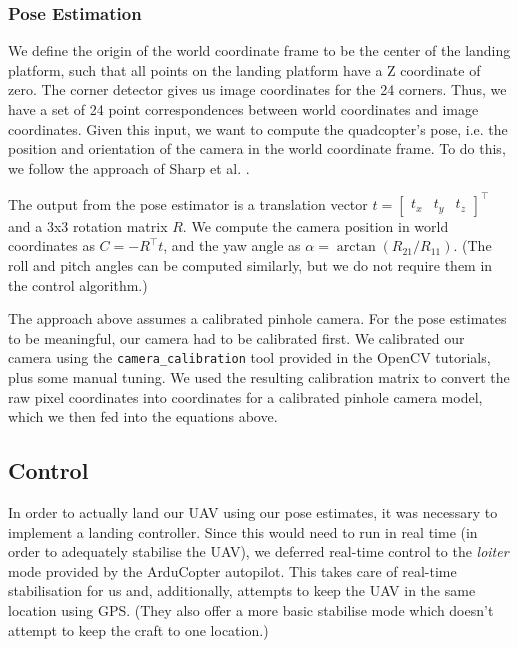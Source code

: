 \documentclass[10pt]{scrartcl} %
\begin{document}
\subsubsection{Pose Estimation}

We define the origin of the world coordinate frame to be the center of the
landing platform, such that all points on the landing platform have a Z
coordinate of zero. The corner detector gives us image coordinates for the 24
corners. Thus, we have a set of 24 point correspondences between world
coordinates and image coordinates. Given this input, we want to compute the
quadcopter's pose, i.e. the position and orientation of the camera in the world
coordinate frame. To do this, we follow the approach of Sharp et al.
\cite{sharp_et_al_2001}.


The output from the pose estimator is a translation vector
$t = \begin{bmatrix} t_x & t_y & t_z \end{bmatrix}^\top$
and a 3x3 rotation matrix $R$. We compute the camera position in world
coordinates as $C = -R^\top t$, and the yaw angle as
$\alpha = \arctan(R_{21} / R_{11})$. (The roll and pitch angles can be computed
similarly, but we do not require them in the control algorithm.)

The approach above assumes a calibrated pinhole camera. For the pose estimates
to be meaningful, our camera had to be calibrated first. We calibrated our
camera using the {\tt camera\_calibration} tool provided in the OpenCV
tutorials, plus some manual tuning. We used the resulting calibration matrix to
convert the raw pixel coordinates into coordinates for a calibrated pinhole
camera model, which we then fed into the equations above.


\subsection{Control}

In order to actually land our UAV using our pose estimates, it was necessary to implement a landing controller. Since this would need to run in real time (in order to adequately stabilise the UAV), we deferred real-time control to the \textit{loiter} mode provided by the ArduCopter autopilot. This takes care of real-time stabilisation for us and, additionally, attempts to keep the UAV in the same location using GPS. (They also offer a more basic stabilise mode which doesn't attempt to keep the craft to one location.)
\end{document}

